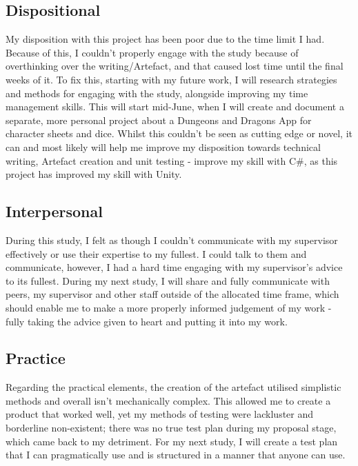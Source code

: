 \documentclass[conference]{IEEEtran}
\begin{document}
\subsection{Dispositional}
My disposition with this project has been poor due to the time limit I had. Because of this, I couldn't properly engage with the study because of overthinking over the writing/Artefact, and that caused lost time until the final weeks of it. To fix this, starting with my future work, I will research strategies and methods for engaging with the study, alongside improving my time management skills.  This will start mid-June, when I will create and document a separate, more personal project about a Dungeons and Dragons App for character sheets and dice. Whilst this couldn't be seen as cutting edge or novel, it can and most likely will help me improve my disposition towards technical writing, Artefact creation and unit testing - improve my skill with C\#, as this project has improved my skill with Unity.

\subsection{Interpersonal}
During this study, I felt as though I couldn't communicate with my supervisor effectively or use their expertise to my fullest. I could talk to them and communicate, however, I had a hard time engaging with my supervisor's advice to its fullest. During my next study, I will share and fully communicate with peers, my supervisor and other staff outside of the allocated time frame, which should enable me to make a more properly informed judgement of my work - fully taking the advice given to heart and putting it into my work.

\subsection{Practice}
Regarding the practical elements, the creation of the artefact utilised simplistic methods and overall isn't mechanically complex. This allowed me to create a product that worked well, yet my methods of testing were lackluster and borderline non-existent; there was no true test plan during my proposal stage, which came back to my detriment. For my next study, I will create a test plan that I can pragmatically use and is structured in a manner that anyone can use. 
\end{document}
